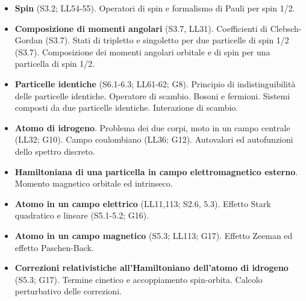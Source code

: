 \documentclass[a4paper,12pt,oneside]{book}
\begin{document}
\begin{itemize}
\item \textbf{Spin} (S3.2; LL54-55). Operatori di spin e formalismo di Pauli per spin 1/2.

\item \textbf{Composizione di momenti angolari} (S3.7, LL31). Coefficienti di Clebsch-Gordan (S3.7). Stati di tripletto e singoletto per due particelle di spin 1/2 (S3.7). Composizione dei momenti angolari orbitale e di spin per una particella di spin 1/2.

\item \textbf{Particelle identiche} (S6.1-6.3; LL61-62; G8). Principio di indistinguibilità delle particelle identiche. Operatore di scambio. Bosoni e fermioni. Sistemi composti da due particelle identiche. Interazione di scambio.

\item \textbf{Atomo di idrogeno}. Problema dei due corpi, moto in un campo centrale (LL32; G10). Campo coulombiano (LL36; G12). Autovalori ed autofunzioni dello spettro discreto.

\item \textbf{Hamiltoniana di una particella in campo elettromagnetico esterno}. Momento magnetico orbitale ed intrinseco.

\item \textbf{Atomo in un campo elettrico} (LL11,113; S2.6, 5.3). Effetto Stark quadratico e lineare (S5.1-5.2; G16).

\item \textbf{Atomo in un campo magnetico} (S5.3; LL113; G17). Effetto Zeeman ed effetto Paschen-Back.

\item \textbf{Correzioni relativistiche all'Hamiltoniano dell'atomo di idrogeno} (S5.3; G17). Termine cinetico e accoppiamento spin-orbita. Calcolo perturbativo delle correzioni.
\end{itemize}
\end{document}
